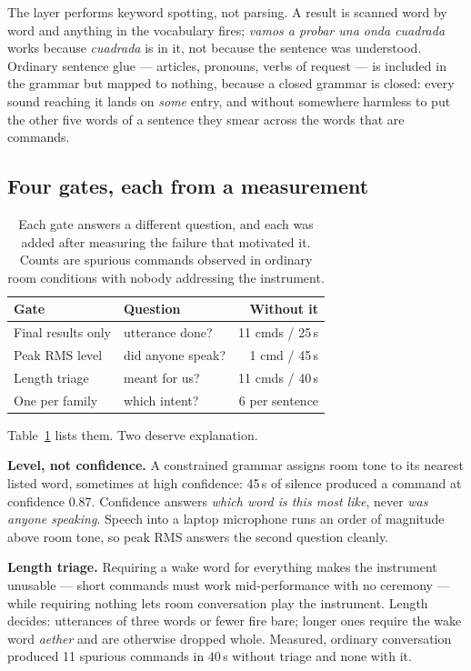 \documentclass[a4paper,10pt,twocolumn]{article}
\begin{document}
The layer performs keyword spotting, not parsing. A result is scanned word by
word and anything in the vocabulary fires; \emph{vamos a probar una onda
cuadrada} works because \emph{cuadrada} is in it, not because the sentence was
understood. Ordinary sentence glue --- articles, pronouns, verbs of request ---
is included in the grammar but mapped to nothing, because a closed grammar is
closed: every sound reaching it lands on \emph{some} entry, and without
somewhere harmless to put the other five words of a sentence they smear across
the words that are commands.

\subsection{Four gates, each from a measurement}

\begin{table}[b]
\centering\small
\begin{tabular}{@{}llr@{}}
\toprule
Gate & Question & Without it \\
\midrule
Final results only & utterance done?   & 11 cmds / 25\,s \\
Peak RMS level     & did anyone speak? & 1 cmd / 45\,s \\
Length triage      & meant for us?     & 11 cmds / 40\,s \\
One per family     & which intent?     & 6 per sentence \\
\bottomrule
\end{tabular}
\caption{Each gate answers a different question, and each was added after
measuring the failure that motivated it. Counts are spurious commands observed
in ordinary room conditions with nobody addressing the instrument.}
\label{tab:gates}
\end{table}

Table~\ref{tab:gates} lists them. Two deserve explanation.

\textbf{Level, not confidence.} A constrained grammar assigns room tone to its
nearest listed word, sometimes at high confidence: 45\,s of silence produced a
command at confidence $0.87$. Confidence answers \emph{which word is this most
like}, never \emph{was anyone speaking}. Speech into a laptop microphone runs
an order of magnitude above room tone, so peak RMS answers the second question
cleanly.

\textbf{Length triage.} Requiring a wake word for everything makes the
instrument unusable --- short commands must work mid-performance with no
ceremony --- while requiring nothing lets room conversation play the
instrument. Length decides: utterances of three words or fewer fire bare;
longer ones require the wake word \emph{aether} and are otherwise dropped
whole. Measured, ordinary conversation produced 11 spurious commands in 40\,s
without triage and none with it.
\end{document}
